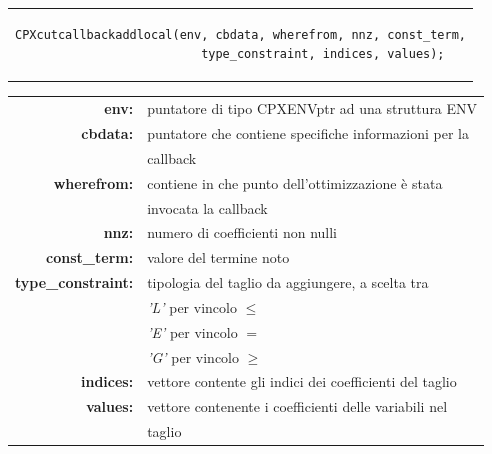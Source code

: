 \begin{center}
\begin{tabular}{c}
\begin{lstlisting}[linewidth=380pt, basicstyle=\footnotesize\sffamily,]  
CPXcutcallbackaddlocal(env, cbdata, wherefrom, nnz, const_term,
                       type_constraint, indices, values);
\end{lstlisting}
\end{tabular}
\end{center}
\begin{table}[h]
\centering
\begin{tabular}{rl}
\textbf{env:} & {puntatore di tipo CPXENVptr ad una struttura ENV}\\
\textbf{cbdata:} & {puntatore che contiene specifiche informazioni per la}\\
&{callback}\\
\textbf{wherefrom:} & {contiene in che punto dell'ottimizzazione è stata} \\ 
&{invocata la callback}\\
\textbf{nnz:} & {numero di coefficienti non nulli} \\
\textbf{const\_term:} & {valore del termine noto} \\
\textbf{type\_constraint:} & {tipologia del taglio da aggiungere, a scelta tra} \\
&{\textit{'L'} per vincolo $\leq$}\\
&{\textit{'E'} per vincolo $=$}\\
&{\textit{'G'} per vincolo $\geq$}\\
\textbf{indices:} & {vettore contente gli indici dei coefficienti del taglio} \\
\textbf{values:} & {vettore contenente i coefficienti delle variabili nel} \\
&{taglio}\\
\end{tabular}
\end{table}
